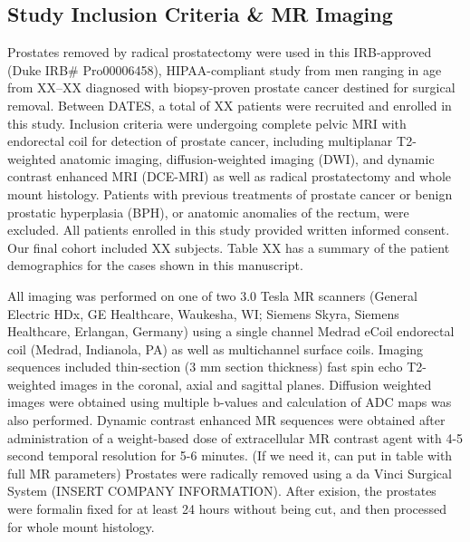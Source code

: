 \subsection{Study Inclusion Criteria \& MR Imaging}
Prostates removed by radical prostatectomy were used in this IRB-approved (Duke
IRB\# Pro00006458), HIPAA-compliant study from men ranging in age from XX--XX
diagnosed with biopsy-proven prostate cancer destined for surgical removal.
Between DATES, a total of XX patients were recruited and enrolled in this
study. Inclusion criteria were undergoing complete pelvic MRI with endorectal
coil for detection of prostate cancer, including multiplanar T2-weighted
anatomic imaging, diffusion-weighted imaging (DWI), and dynamic contrast
enhanced MRI (DCE-MRI) as well as radical prostatectomy and whole mount
histology. Patients with previous treatments of prostate cancer or benign
prostatic hyperplasia (BPH), or anatomic anomalies of the rectum, were
excluded.  All patients enrolled in this study provided written informed
consent. Our final cohort included XX subjects. Table XX has a summary of the
patient demographics for the cases shown in this manuscript.  

All imaging was performed on one of two 3.0 Tesla MR scanners (General Electric
HDx, GE Healthcare, Waukesha, WI;  Siemens Skyra, Siemens Healthcare, Erlangan,
Germany) using a single channel Medrad eCoil endorectal coil (Medrad,
Indianola, PA) as well as multichannel surface coils.  Imaging sequences
included thin-section (3 mm section thickness) fast spin echo T2-weighted
images in the coronal, axial and sagittal planes.  Diffusion weighted images
were obtained using multiple b-values and calculation of ADC maps was also
performed.  Dynamic contrast enhanced MR sequences were obtained after
administration of a weight-based dose of extracellular MR contrast agent with
4-5 second temporal resolution for 5-6 minutes. (If we need it, can put in
table with full MR parameters) Prostates were radically removed using a da
Vinci Surgical System (INSERT COMPANY INFORMATION).  After exision, the
prostates were formalin fixed for at least 24 hours without being cut, and then
processed for whole mount histology.
